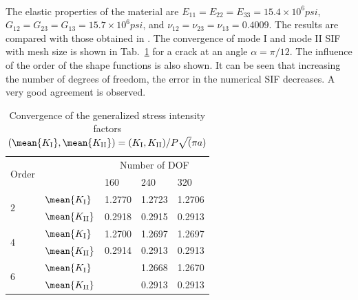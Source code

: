 \paragraph{}
The elastic properties of the material are $E_{11} = E_{22}= E_{33}=15.4\times 10^6 psi$, $G_{12} = G_{23} = G_{13} = 15.7 \times 10^6 psi$, and $\nu_{12} = \nu_{23} = \nu_{13} = 0.4009$.
The results are compared with those obtained in \citep{Banks2005}.
The convergence of mode \RN{1} and mode \RN{2} SIF with mesh size is shown in Tab.~\ref{iso_tab:angled_crack_convergence} for a crack at an angle $\alpha = \pi/12$.
The influence of the order of the shape functions is also shown.
It can be seen that increasing the number of degrees of freedom, the error in the numerical SIF decreases.
A very good agreement is observed.

\begin{table}
\caption{Convergence of the generalized stress intensity factors $
    (\mean{K_{\mathrm I}}, \mean{K_{\mathrm{II}}}) =
    (K_{\mathrm I},K_{\mathrm{II}}) /
    P\sqrt(\pi a)
    $}
\label{iso_tab:angled_crack_convergence}
\begin{tabularx}{\textwidth}{XXXXX}
    \toprule
    \multirow{2}{*}{Order}& & \multicolumn{3}{c}{Number of DOF} \\
    \cmidrule{3-5}
    & & 160 & 240 & 320 \\
    \multirow{2}{*}{$2$}    &   $\mean{K_{\mathrm I}}$   &   1.2770  &   1.2723  &   1.2706  \\
                            &   $\mean{K_{\mathrm{II}}}$   &   0.2918  &   0.2915  &   0.2913  \\
    \multirow{2}{*}{$4$}    &   $\mean{K_{\mathrm I}}$   &   1.2700  &   1.2697  &   1.2697  \\
                            &   $\mean{K_{\mathrm{II}}}$   &   0.2914  &   0.2913  &   0.2913  \\
    \multirow{2}{*}{$6$}    &   $\mean{K_{\mathrm I}}$   &           &   1.2668  &   1.2670  \\
                            &   $\mean{K_{\mathrm{II}}}$   &           &   0.2913  &   0.2913  \\                           
    \midrule
    \bottomrule
\end{tabularx}
\end{table}


